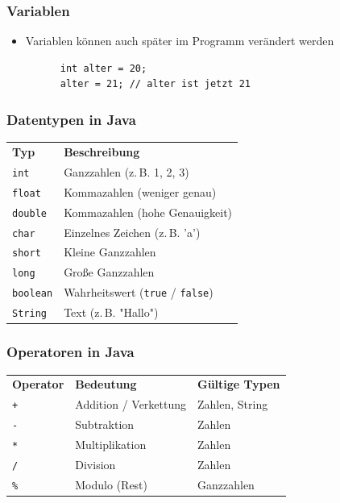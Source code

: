 \documentclass{../../presentation}
\begin{document}
\begin{frame}[fragile]
	\frametitle{Variablen}
	\pause
	\begin{itemize}
		\item Variablen können auch später im Programm verändert werden
		      \begin{verbatim}
      int alter = 20;
      alter = 21; // alter ist jetzt 21
    \end{verbatim}
	\end{itemize}
\end{frame}

\begin{frame}
	\frametitle{Datentypen in Java}
	\pause
	\centering
	\begin{tabular}{l l}
		\rowcolor{tablehead}
		\textbf{Typ}     & \textbf{Beschreibung}                          \\
		\texttt{int}     & Ganzzahlen (z.\,B. 1, 2, 3)                    \\
		\texttt{float}   & Kommazahlen (weniger genau)                    \\
		\texttt{double}  & Kommazahlen (hohe Genauigkeit)                 \\
		\texttt{char}    & Einzelnes Zeichen (z.\,B. 'a')                 \\
		\texttt{short}   & Kleine Ganzzahlen                              \\
		\texttt{long}    & Große Ganzzahlen                               \\
		\texttt{boolean} & Wahrheitswert (\texttt{true} / \texttt{false}) \\
		\texttt{String}  & Text (z.\,B. "Hallo")                          \\
	\end{tabular}
\end{frame}

\begin{frame}
	\frametitle{Operatoren in Java}
	\pause
	\centering
	\begin{tabular}{l l l}
		\rowcolor{tablehead}
		\textbf{Operator} & \textbf{Bedeutung}    & \textbf{Gültige Typen} \\
		\texttt{+}        & Addition / Verkettung & Zahlen, String         \\
		\texttt{-}        & Subtraktion           & Zahlen                 \\
		\texttt{*}        & Multiplikation        & Zahlen                 \\
		\texttt{/}        & Division              & Zahlen                 \\
		\texttt{\%}       & Modulo (Rest)         & Ganzzahlen             \\
	\end{tabular}
\end{frame}
\end{document}
